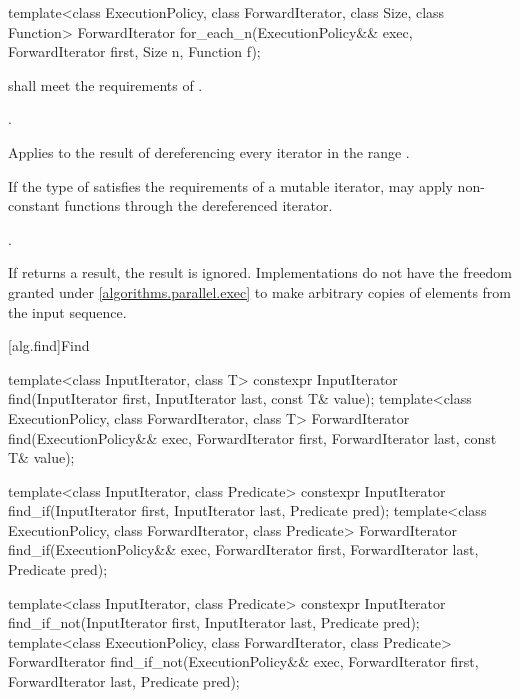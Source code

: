 %
\begin{itemdecl}
template<class ExecutionPolicy, class ForwardIterator, class Size, class Function>
  ForwardIterator for_each_n(ExecutionPolicy&& exec, ForwardIterator first, Size n,
                             Function f);
\end{itemdecl}

\begin{itemdescr}
\pnum
\requires
{} shall meet the requirements of .

\pnum
\requires
{}.

\pnum
\effects
Applies  to the result of dereferencing every iterator in the range
.
\begin{note}
If the type of  satisfies the requirements of a mutable iterator,
 may apply non-constant functions through the dereferenced iterator.
\end{note}

\pnum
\returns
{}.

\pnum
\remarks
If  returns a result, the result is ignored.  Implementations do not
have the freedom granted under \ref{algorithms.parallel.exec} to make arbitrary
copies of elements from the input sequence.
\end{itemdescr}


[alg.find]{Find}

%
%
%
\begin{itemdecl}
template<class InputIterator, class T>
  constexpr InputIterator find(InputIterator first, InputIterator last,
                               const T& value);
template<class ExecutionPolicy, class ForwardIterator, class T>
  ForwardIterator find(ExecutionPolicy&& exec, ForwardIterator first, ForwardIterator last,
                       const T& value);

template<class InputIterator, class Predicate>
  constexpr InputIterator find_if(InputIterator first, InputIterator last,
                                  Predicate pred);
template<class ExecutionPolicy, class ForwardIterator, class Predicate>
  ForwardIterator find_if(ExecutionPolicy&& exec, ForwardIterator first, ForwardIterator last,
                          Predicate pred);

template<class InputIterator, class Predicate>
  constexpr InputIterator find_if_not(InputIterator first, InputIterator last,
                                      Predicate pred);
template<class ExecutionPolicy, class ForwardIterator, class Predicate>
  ForwardIterator find_if_not(ExecutionPolicy&& exec, ForwardIterator first, ForwardIterator last,
                              Predicate pred);
\end{itemdecl}

